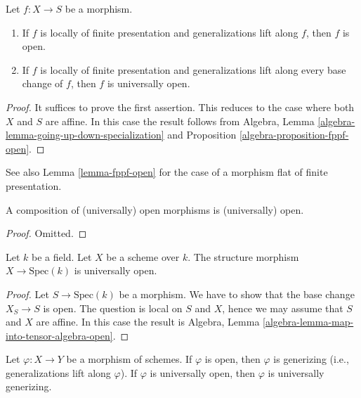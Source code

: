 \begin{lemma}
\label{lemma-locally-finite-presentation-universally-open}
Let $f : X \to S$ be a morphism.
\begin{enumerate}
\item If $f$ is locally of finite presentation and generalizations lift
along $f$, then $f$ is open.
\item If $f$ is locally of finite presentation and generalizations lift
along every base change of $f$, then $f$ is universally open.
\end{enumerate}
\end{lemma}

\begin{proof}
It suffices to prove the first assertion.
This reduces to the case where both $X$ and $S$ are affine.
In this case the result follows from
Algebra, Lemma \ref{algebra-lemma-going-up-down-specialization}
and Proposition \ref{algebra-proposition-fppf-open}.
\end{proof}

\noindent
See also Lemma \ref{lemma-fppf-open} for the case of a morphism
flat of finite presentation.

\begin{lemma}
\label{lemma-composition-open}
A composition of (universally) open morphisms is (universally) open.
\end{lemma}

\begin{proof}
Omitted.
\end{proof}

\begin{lemma}
\label{lemma-scheme-over-field-universally-open}
Let $k$ be a field. Let $X$ be a scheme over $k$.
The structure morphism $X \to \text{Spec}(k)$ is universally open.
\end{lemma}

\begin{proof}
Let $S \to \text{Spec}(k)$ be a morphism.
We have to show that the base change $X_S \to S$ is open.
The question is local on $S$ and $X$, hence we may assume that
$S$ and $X$ are affine. In this case the result is
Algebra, Lemma \ref{algebra-lemma-map-into-tensor-algebra-open}.
\end{proof}

\begin{lemma}
\label{lemma-open-generizing}
Let $\varphi : X \to Y$ be a morphism of schemes.
If $\varphi$ is open, then $\varphi$ is generizing
(i.e., generalizations lift along $\varphi$).
If $\varphi$ is universally open, then $\varphi$ is
universally generizing.
\end{lemma}

